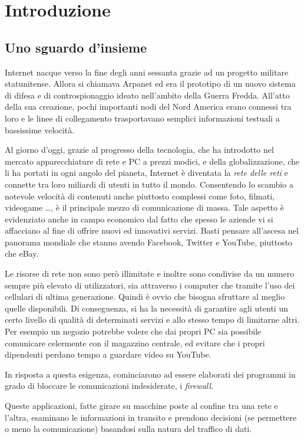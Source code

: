 \clearpage{\pagestyle{empty}\cleardoublepage}
\chapter{Introduzione}

\section{Uno sguardo d'insieme}

Internet nacque verso la fine degli anni sessanta grazie ad un progetto militare statunitense. Allora si chiamava Arpanet ed era il prototipo di un nuovo sistema di difesa e di controspionaggio ideato nell'ambito della Guerra Fredda. All'atto della sua creazione, pochi importanti nodi del Nord America erano connessi tra loro e le linee di collegamento trasportavano semplici informazioni testuali a bassissime velocità.

Al giorno d'oggi, grazie al progresso della tecnologia, che ha introdotto nel mercato apparecchiature di rete e PC a prezzi modici, e della globalizzazione, che li ha portati in ogni angolo del pianeta, Internet è diventata la \emph{rete delle reti} e connette tra loro miliardi di utenti in tutto il mondo. Consentendo lo scambio a notevole velocità di contenuti anche piuttosto complessi come foto, filmati, videogame \dots , è il principale mezzo di comunicazione di massa. Tale aspetto è evidenziato anche in campo economico dal fatto che spesso le aziende vi si affacciano al fine di offrire nuovi ed innovativi servizi. Basti pensare all'ascesa nel panorama mondiale che stanno avendo Facebook, Twitter e YouTube, piuttosto che eBay.

Le risorse di rete non sono però illimitate e inoltre sono condivise da un numero sempre più elevato di utilizzatori, sia attraverso i computer che tramite l'uso dei cellulari di ultima generazione. Quindi è ovvio che bisogna sfruttare al meglio quelle disponibili. Di conseguenza, si ha la necessità di garantire agli utenti un certo livello di qualità di determinati servizi e allo stesso tempo di limitarne altri. Per esempio un negozio potrebbe volere che dai propri PC sia possibile comunicare celermente con il magazzino centrale, ed evitare che i propri dipendenti perdano tempo a guardare video su YouTube.

In risposta a questa esigenza, cominciarono ad essere elaborati dei programmi in grado di bloccare le comunicazioni indesiderate, i \emph{firewall}.

Queste applicazioni, fatte girare su macchine poste al confine tra una rete e l'altra, esaminano le informazioni in transito e prendono decisioni (se permettere o meno la comunicazione) basandosi sulla natura del traffico di dati.

